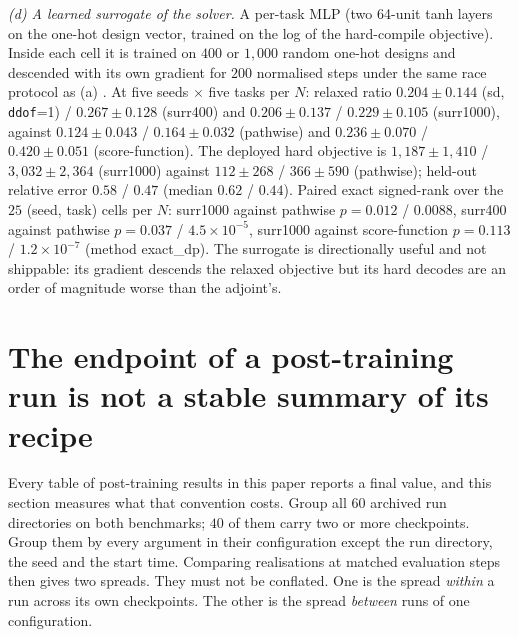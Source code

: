 \emph{(d) A learned surrogate of the solver.}  A per-task MLP (two 64-unit tanh
layers on the one-hot design vector, trained on the log of the hard-compile
objective).  Inside each cell it is trained on $400$ or $1{,}000$ random one-hot designs
and descended with its own gradient for $200$ normalised steps under the same race
protocol as (a) \cite{shahriari2016bayes,jones1998ego,brunton2020ml}.  At five seeds $\times$ five tasks per $N$: relaxed ratio
$0.204\pm0.144$ (sd, \texttt{ddof}=1) / $0.267\pm0.128$ (surr400) and $0.206\pm0.137$ / $0.229\pm0.105$
(surr1000), against $0.124\pm0.043$ / $0.164\pm0.032$ (pathwise) and
$0.236\pm0.070$ / $0.420\pm0.051$ (score-function).  The deployed hard objective is
$1{,}187\pm1{,}410$ / $3{,}032\pm2{,}364$ (surr1000) against $112\pm268$ /
$366\pm590$ (pathwise); held-out relative error $0.58$ / $0.47$ (median $0.62$ /
$0.44$).  Paired exact signed-rank over the $25$ (seed, task) cells per $N$:
surr1000 against pathwise $p=0.012$ / $0.0088$, surr400 against pathwise
$p=0.037$ / $4.5\times10^{-5}$, surr1000 against score-function $p=0.113$ /
$1.2\times10^{-7}$ (method exact\_dp).  The surrogate is directionally useful and
not shippable: its gradient descends the relaxed objective but its hard decodes are
an order of magnitude worse than the adjoint's.

\section{The endpoint of a post-training run is not a stable summary of its recipe}
\label{supp:bstab}
Every table of post-training results in this paper reports a final value, and this section measures what
that convention costs.  Group all $60$ archived run directories on both benchmarks;
$40$ of them carry two or more checkpoints.  Group them by every argument in their
configuration except the run directory, the seed and the start time.  Comparing
realisations at matched evaluation steps then gives two spreads.  They must not
be conflated.  One is the spread \emph{within} a run across its own checkpoints.  The
other is the spread \emph{between} runs of one configuration.

